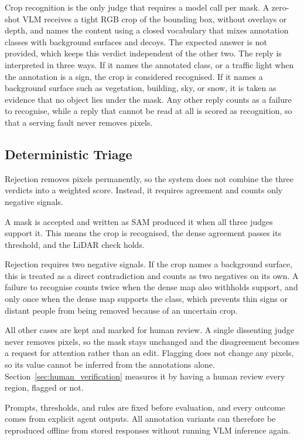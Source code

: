 \documentclass[journal]{IEEEtran}
\begin{document}
Crop recognition is the only judge that requires a model call per mask. 
A zero-shot VLM receives a tight RGB crop of the bounding box, without overlays or depth, and names the content using a closed vocabulary that mixes annotation classes with background surfaces and decoys. 
The expected answer is not provided, which keeps this verdict independent of the other two. 
The reply is interpreted in three ways. 
If it names the annotated class, or a traffic light when the annotation is a sign, the crop is considered recognised. 
If it names a background surface such as vegetation, building, sky, or snow, it is taken as evidence that no object lies under the mask. 
Any other reply counts as a failure to recognise, while a reply that cannot be read at all is scored as recognition, so that a serving fault never removes pixels.

\subsection{Deterministic Triage}

Rejection removes pixels permanently, so the system does not combine the three verdicts into a weighted score. 
Instead, it requires agreement and counts only negative signals.

A mask is accepted and written as SAM produced it when all three judges support it. 
This means the crop is recognised, the dense agreement passes its threshold, and the LiDAR check holds.

Rejection requires two negative signals. 
If the crop names a background surface, this is treated as a direct contradiction and counts as two negatives on its own. 
A failure to recognise counts twice when the dense map also withholds support, and only once when the dense map supports the class, which prevents thin signs or distant people from being removed because of an uncertain crop.

All other cases are kept and marked for human review. 
A single dissenting judge never removes pixels, so the mask stays unchanged and the disagreement becomes a request for attention rather than an edit. 
Flagging does not change any pixels, so its value cannot be inferred from the annotations alone. 
Section~\ref{sec:human_verification} measures it by having a human review every region, flagged or not.

Prompts, thresholds, and rules are fixed before evaluation, and every outcome comes from explicit agent outputs. 
All annotation variants can therefore be reproduced offline from stored responses without running VLM inference again.
\end{document}
